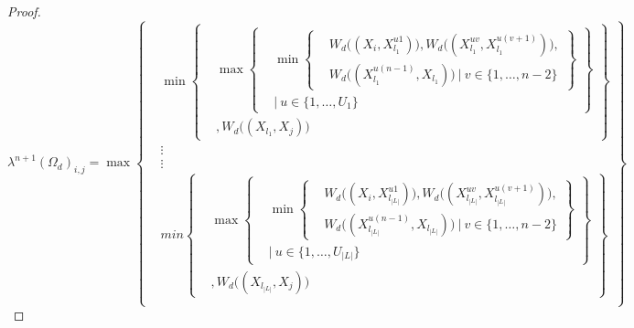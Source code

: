 \documentclass{article} %
\theoremstyle{style1}
\theoremstyle{style1}
\theoremstyle{example}
\begin{document}
\begin{proof}
\[
\lambda^{n+1}(\Omega_d)_{i,j} =\max
\left\{
  \begin{aligned}
    &\min
      \left\{
      \begin{aligned}
        &\max
          \left\{
          \begin{aligned}
            &\min\left\{
            \begin{aligned}
            &W_d\big((X_i,X_{l_1}^{u1})\big), W_d\big((X_{l_1}^{uv},X_{l_1}^{u(v+1)})\big), \\
            &W_d\big((X_{l_1}^{u(n-1)},X_{l_1})\big)\ |\ v\in\{1,\ldots,n-2\}
            \end{aligned}
            \right\} \\
            &|\ u\in\{1,\ldots,U_1\}
          \end{aligned}
          \right\} \\
          &, W_d\big((X_{l_1},X_j)\big)
      \end{aligned}
      \right\} \\
      &\vdots \\
      &\vdots \\
    &min
      \left\{
      \begin{aligned}
        &\max
          \left\{
          \begin{aligned}
            &\min\left\{
            \begin{aligned}
            &W_d\big((X_i,X_{l_{|L|}}^{u1})\big), W_d\big((X_{l_{|L|}}^{uv},X_{l_{|L|}}^{u(v+1)})\big), \\
            &W_d\big((X_{l_{|L|}}^{u(n-1)},X_{l_{|L|}})\big)\ |\ v\in\{1,\ldots,n-2\}
            \end{aligned}
            \right\} \\
            &|\ u\in\{1,\ldots,U_{|L|}\}
          \end{aligned}
          \right\} \\
          &, W_d\big((X_{l_{|L|}},X_j)\big)
      \end{aligned}
      \right\} \\
  \end{aligned}
\right\}
\]


\end{proof}
\end{document}

